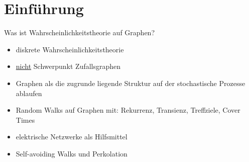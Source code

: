 \section*{Einführung}
Was ist Wahrscheinlichkeitstheorie auf Graphen?

\begin{itemize}
		\item diskrete Wahrscheinlichkeitstheorie
		\item \underline{nicht} Schwerpunkt Zufallsgraphen
		\item Graphen als die zugrunde liegende Struktur auf der stochastische Prozesse ablaufen
		\item Random Walks auf Graphen mit: Rekurrenz, Transienz, Treffziele, Cover Times
		\item elektrische Netzwerke als Hilfsmittel
		\item Self-avoiding Walks und Perkolation
\end{itemize}

